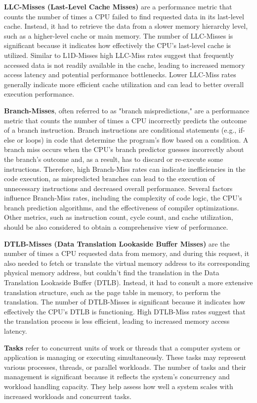 \textbf{LLC-Misses (Last-Level Cache Misses)} are a performance metric that counts the number of times a CPU failed to find requested data in its last-level cache. Instead, it had to retrieve the data from a slower memory hierarchy level, such as a higher-level cache or main memory. The number of LLC-Misses is significant because it indicates how effectively the CPU's last-level cache is utilized. Similar to L1D-Misses high LLC-Miss rates suggest that frequently accessed data is not readily available in the cache, leading to increased memory access latency and potential performance bottlenecks. Lower LLC-Miss rates generally indicate more efficient cache utilization and can lead to better overall execution performance.

\textbf{Branch-Misses}, often referred to as "branch mispredictions," are a performance metric that counts the number of times a CPU incorrectly predicts the outcome of a branch instruction. Branch instructions are conditional statements (e.g., if-else or loops) in code that determine the program's flow based on a condition. A branch miss occurs when the CPU's branch predictor guesses incorrectly about the branch's outcome and, as a result, has to discard or re-execute some instructions. Therefore, high Branch-Miss rates can indicate inefficiencies in the code execution, as mispredicted branches can lead to the execution of unnecessary instructions and decreased overall performance. Several factors influence Branch-Miss rates, including the complexity of code logic, the CPU's branch prediction algorithms, and the effectiveness of compiler optimizations. Other metrics, such as instruction count, cycle count, and cache utilization, should be also considered to obtain a comprehensive view of performance.

\textbf{DTLB-Misses (Data Translation Lookaside Buffer Misses)} are the number of times a CPU requested data from memory, and during this request, it also needed to fetch or translate the virtual memory address to its corresponding physical memory address, but couldn't find the translation in the Data Translation Lookaside Buffer (DTLB). Instead, it had to consult a more extensive translation structure, such as the page table in memory, to perform the translation. The number of DTLB-Misses is significant because it indicates how effectively the CPU's DTLB is functioning. High DTLB-Miss rates suggest that the translation process is less efficient, leading to increased memory access latency.

\textbf{Tasks} refer to concurrent units of work or threads that a computer system or application is managing or executing simultaneously. These tasks may represent various processes, threads, or parallel workloads. The number of tasks and their management is significant because it reflects the system's concurrency and workload handling capacity. They help assess how well a system scales with increased workloads and concurrent tasks.


